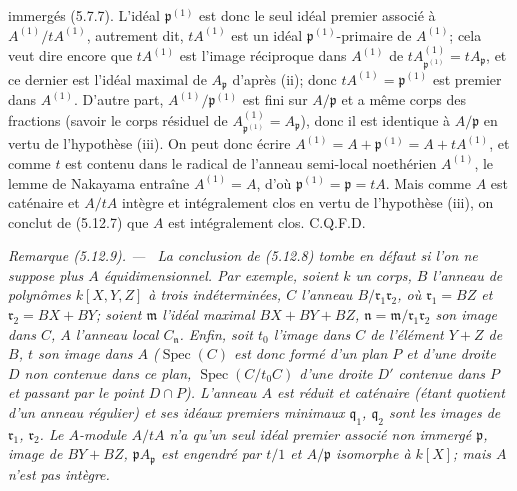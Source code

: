 \documentclass[10pt,oneside]{book}
\newcommand{\oldpage}[2][]{%
  \setcounter{footnote}{0}%
  \marginpar{\scriptsize\textbf{#1}~|~#2}\ignorespaces}
\newenvironment{remark}[1][]{%
  \par\medskip\noindent\itshape Remarque (#1). ---\ }{\par}
\begin{document}
\oldpage[IV-2]{130}

immergés (5.7.7). L'idéal $\mathfrak p^{(1)}$ est donc le seul idéal premier
associé à $A^{(1)}/tA^{(1)}$, autrement dit, $tA^{(1)}$ est un idéal
$\mathfrak p^{(1)}$-primaire de $A^{(1)}$; cela veut dire encore que
$tA^{(1)}$ est l'image réciproque dans $A^{(1)}$ de
$tA^{(1)}_{\mathfrak p^{(1)}}=tA_{\mathfrak p}$, et ce dernier est l'idéal
maximal de $A_{\mathfrak p}$ d'après (ii); donc
$tA^{(1)}=\mathfrak p^{(1)}$ est premier dans $A^{(1)}$. D'autre part,
$A^{(1)}/\mathfrak p^{(1)}$ est fini sur $A/\mathfrak p$ et a même corps des
fractions (savoir le corps résiduel de
$A^{(1)}_{\mathfrak p^{(1)}}=A_{\mathfrak p}$), donc il est identique à
$A/\mathfrak p$ en vertu de l'hypothèse (iii). On peut donc écrire
$A^{(1)}=A+\mathfrak p^{(1)}=A+tA^{(1)}$, et comme $t$ est contenu dans le
radical de l'anneau semi-local noethérien $A^{(1)}$, le lemme de Nakayama
entraîne $A^{(1)}=A$, d'où $\mathfrak p^{(1)}=\mathfrak p=tA$. Mais comme $A$
est caténaire et $A/tA$ intègre et intégralement clos en vertu de l'hypothèse
(iii), on conclut de (5.12.7) que $A$ est intégralement clos. C.Q.F.D.

\begin{remark}[5.12.9]
\label{IV.2.s5.12.9-fr}
La conclusion de (5.12.8) tombe en défaut si l'on ne suppose plus $A$
équidimensionnel. Par exemple, soient $k$ un corps, $B$ l'anneau de polynômes
$k[X,Y,Z]$ à trois indéterminées, $C$ l'anneau
$B/\mathfrak r_1\mathfrak r_2$, où $\mathfrak r_1=BZ$ et
$\mathfrak r_2=BX+BY$; soient $\mathfrak m$ l'idéal maximal $BX+BY+BZ$,
$\mathfrak n=\mathfrak m/\mathfrak r_1\mathfrak r_2$ son image dans $C$, $A$
l'anneau local $C_{\mathfrak n}$. Enfin, soit $t_0$ l'image dans $C$ de
l'élément $Y+Z$ de $B$, $t$ son image dans $A$
($\operatorname{Spec}(C)$ est donc formé d'un plan $P$ et d'une droite $D$ non
contenue dans ce plan, $\operatorname{Spec}(C/t_0C)$ d'une droite $D'$ contenue
dans $P$ et passant par le point $D\cap P$). L'anneau $A$ est réduit et
caténaire (étant quotient d'un anneau régulier) et ses idéaux premiers minimaux
$\mathfrak q_1$, $\mathfrak q_2$ sont les images de $\mathfrak r_1$,
$\mathfrak r_2$. Le $A$-module $A/tA$ n'a qu'un seul idéal premier associé non
immergé $\mathfrak p$, image de $BY+BZ$, $\mathfrak pA_{\mathfrak p}$ est
engendré par $t/1$ et $A/\mathfrak p$ isomorphe à $k[X]$; mais $A$ n'est pas
intègre.
\end{remark}
\end{document}
